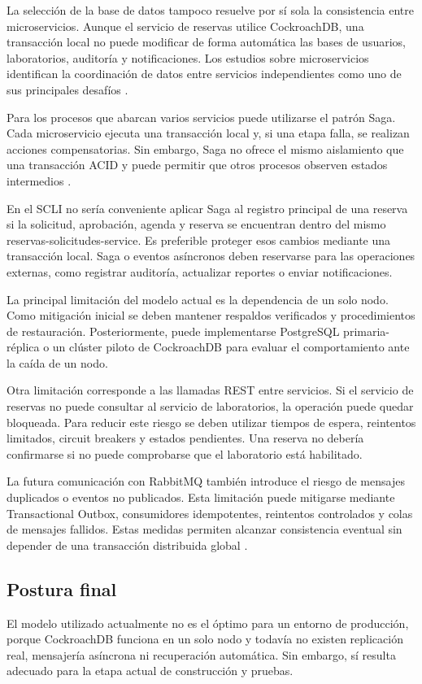 \documentclass[conference]{IEEEtran}
\begin{document}
La selección de la base de datos tampoco resuelve por sí sola la consistencia entre microservicios. Aunque el servicio de reservas utilice CockroachDB, una transacción local no puede modificar de forma automática las bases de usuarios, laboratorios, auditoría y notificaciones. Los estudios sobre microservicios identifican la coordinación de datos entre servicios independientes como uno de sus principales desafíos \cite{ref2}.

Para los procesos que abarcan varios servicios puede utilizarse el patrón Saga. Cada microservicio ejecuta una transacción local y, si una etapa falla, se realizan acciones compensatorias. Sin embargo, Saga no ofrece el mismo aislamiento que una transacción ACID y puede permitir que otros procesos observen estados intermedios \cite{ref6}.

En el SCLI no sería conveniente aplicar Saga al registro principal de una reserva si la solicitud, aprobación, agenda y reserva se encuentran dentro del mismo reservas-solicitudes-service. Es preferible proteger esos cambios mediante una transacción local. Saga o eventos asíncronos deben reservarse para las operaciones externas, como registrar auditoría, actualizar reportes o enviar notificaciones.

La principal limitación del modelo actual es la dependencia de un solo nodo. Como mitigación inicial se deben mantener respaldos verificados y procedimientos de restauración. Posteriormente, puede implementarse PostgreSQL primaria-réplica o un clúster piloto de CockroachDB para evaluar el comportamiento ante la caída de un nodo.

Otra limitación corresponde a las llamadas REST entre servicios. Si el servicio de reservas no puede consultar al servicio de laboratorios, la operación puede quedar bloqueada. Para reducir este riesgo se deben utilizar tiempos de espera, reintentos limitados, circuit breakers y estados pendientes. Una reserva no debería confirmarse si no puede comprobarse que el laboratorio está habilitado.

La futura comunicación con RabbitMQ también introduce el riesgo de mensajes duplicados o eventos no publicados. Esta limitación puede mitigarse mediante Transactional Outbox, consumidores idempotentes, reintentos controlados y colas de mensajes fallidos. Estas medidas permiten alcanzar consistencia eventual sin depender de una transacción distribuida global \cite{ref2,ref6}.

\subsection{Postura final}
El modelo utilizado actualmente no es el óptimo para un entorno de producción, porque CockroachDB funciona en un solo nodo y todavía no existen replicación real, mensajería asíncrona ni recuperación automática. Sin embargo, sí resulta adecuado para la etapa actual de construcción y pruebas.
\end{document}
